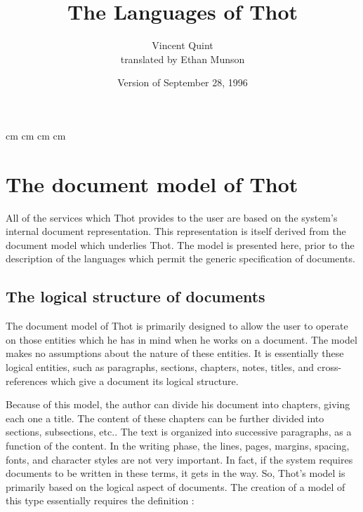 
\marginparwidth 0pt
 cm
 cm
\marginparsep 0pt
\topmargin   0pt
 cm
 cm

\newcommand{\ignore}[1]{}
\newenvironment{example}{\begin{quotation}\noindent{\bf Example~:}}{\end{quotation}}

\title{\Huge The Languages of Thot}
\author{Vincent Quint\\
translated by Ethan Munson}
\date{Version of September 28, 1996}
\maketitle

\setcounter{page}{1}
\tableofcontents
\cleardoublepage

\setcounter{page}{1}
\chapter{The document model of Thot}

All of the services which Thot provides to the user are based on the
system's internal document representation.  This representation is
itself derived from the document model which underlies Thot.  The
model is presented here, prior to the description of the languages
which permit the generic specification of documents.

\section{The logical structure of documents}

The document model of Thot is primarily designed to allow the user to
operate on those entities which he has in mind when he works on a
document.  The model makes no assumptions about the nature of these entities.
It is essentially these logical entities, such as paragraphs, sections,
chapters, notes, titles, and cross-references which give a document
its logical structure.

Because of this model, the author can divide his document into
chapters, giving each one a title.  The content of these chapters can
be further divided into sections, subsections, etc..  The text is
organized into successive paragraphs, as a function of the content.
In the writing phase, the lines, pages, margins, spacing, fonts,
and character styles are not very important.  In fact, if the system
requires documents to be written in these terms, it gets in the way.
So, Thot's model is primarily based on the logical aspect of
documents.  The creation of a model of this type essentially requires
the definition :

